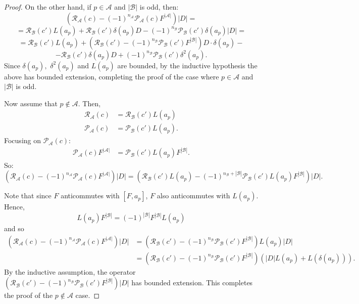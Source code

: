 \begin{proof}
        On the other hand, if $p \in \mathscr{A}$ and $|\mathscr{B}|$ is odd, then:
        $$(\mathcal{R}_{\mathscr{A}}(c) - (-1)^{n_{\mathscr{A}}}\mathcal{P}_{\mathscr{A}}(c)F^{|\mathscr{A}|})|D|=$$
        $$= \mathcal{R}_{\mathscr{B}}(c')L(a_p)+\mathcal{R}_{\mathscr{B}}(c')\delta(a_p)D-(-1)^{n_{\mathscr{B}}}\mathcal{P}_{\mathscr{B}}(c')\delta(a_p)|D|=$$
        $$= \mathcal{R}_{\mathscr{B}}(c')L(a_p)+(\mathcal{R}_{\mathscr{B}}(c')-(-1)^{n_{\mathscr{B}}}\mathcal{P}_{\mathscr{B}}(c')F^{|\mathscr{B}|})D\cdot\delta(a_p)-$$
        $$-\mathcal{R}_{\mathscr{B}}(c')\delta(a_p)D+(-1)^{n_{\mathscr{B}}}\mathcal{P}_{\mathscr{B}}(c')\delta^2(a_p).$$
        Since $\delta(a_p),$ $\delta^2(a_p)$ and $L(a_p)$ are bounded, by the inductive hypothesis the above has bounded extension, completing the proof of the case where $p \in \mathscr{A}$ and $|\mathscr{B}|$ is odd.
        
        Now assume that $p\notin \mathscr{A}$. Then,
        \begin{align*}
            \mathcal{R}_{\mathscr{A}}(c) &= \mathcal{R}_{\mathscr{B}}(c')L(a_p)\\
            \mathcal{P}_{\mathscr{A}}(c) &= \mathcal{P}_{\mathscr{B}}(c')L(a_p).
        \end{align*}
        Focusing on $\mathcal{P}_{\mathscr{A}}(c)$:
        \begin{align*}
            \mathcal{P}_{\mathscr{A}}(c)F^{|\mathscr{A}|} &= \mathcal{P}_{\mathscr{B}}(c')L(a_p)F^{|\mathscr{B}|}.
        \end{align*}
        So:
        \begin{equation*}
             (\mathcal{R}_{\mathscr{A}}(c)-(-1)^{n_{\mathscr{A}}}\mathcal{P}_{\mathscr{A}}(c)F^{|\mathscr{A}|})|D| = (\mathcal{R}_{\mathscr{B}}(c')L(a_p)-(-1)^{n_{\mathscr{B}}+|\mathscr{B}|}\mathcal{P}_{\mathscr{B}}(c')L(a_p)F^{|\mathscr{B}|})|D|.
        \end{equation*}
        
        Note that since $F$ anticommutes with $[F,a_p]$, $F$ also anticommutes with $L(a_p)$. Hence,
        \begin{equation*}
            L(a_p)F^{|\mathscr{B}|} = (-1)^{|\mathscr{B}|}F^{|\mathscr{B}|}L(a_p)
        \end{equation*}
        and so
        \begin{align*}
            (\mathcal{R}_{\mathscr{A}}(c)-(-1)^{n_{\mathscr{A}}}\mathcal{P}_{\mathscr{A}}(c)F^{|\mathscr{A}|})|D| &= (\mathcal{R}_{\mathscr{B}}(c')-(-1)^{n_{\mathscr{B}}}\mathcal{P}_{\mathscr{B}}(c')F^{|\mathscr{B}|})L(a_p)|D|\\
                                                                  &= (\mathcal{R}_{\mathscr{B}}(c')-(-1)^{n_{\mathscr{B}}}\mathcal{P}_{\mathscr{B}}(c')F^{|\mathscr{B}|})(|D|L(a_p)+L(\delta(a_p))).
        \end{align*}
        By the inductive assumption, the operator $(\mathcal{R}_{\mathscr{B}}(c')-(-1)^{n_{\mathscr{B}}}\mathcal{P}_{\mathscr{B}}(c')F^{|\mathscr{B}|})|D|$ has bounded extension. This completes the proof of the $p \notin \mathscr{A}$ case.
        

\end{proof}
